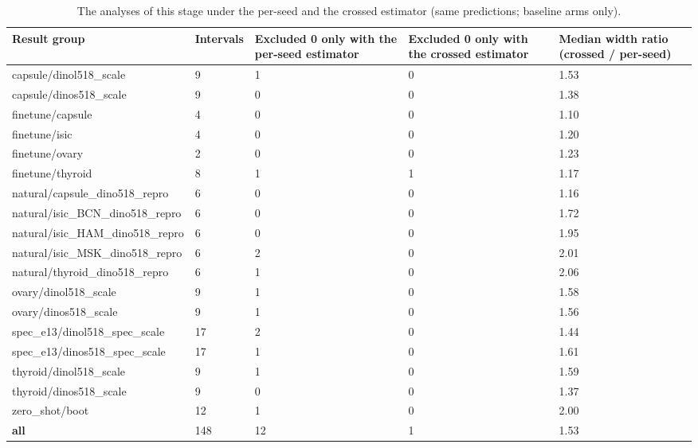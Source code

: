 \begin{table}[H]\centering\scriptsize
\caption{The analyses of this stage under the per-seed and the crossed estimator (same predictions; baseline arms only).}\label{tab:estcheck}
\begin{tabular}{p{5.0cm}p{1.4cm}p{2.6cm}p{2.6cm}p{2.4cm}}\toprule
Result group & Intervals & Excluded 0 only with the per-seed estimator & Excluded 0 only with the crossed estimator & Median width ratio (crossed / per-seed) \\\midrule
capsule/\allowbreak{}dinol518\_scale & 9 & 1 & 0 & 1.53 \\
capsule/\allowbreak{}dinos518\_scale & 9 & 0 & 0 & 1.38 \\
finetune/\allowbreak{}capsule & 4 & 0 & 0 & 1.10 \\
finetune/\allowbreak{}isic & 4 & 0 & 0 & 1.20 \\
finetune/\allowbreak{}ovary & 2 & 0 & 0 & 1.23 \\
finetune/\allowbreak{}thyroid & 8 & 1 & 1 & 1.17 \\
natural/\allowbreak{}capsule\_dino518\_repro & 6 & 0 & 0 & 1.16 \\
natural/\allowbreak{}isic\_BCN\_dino518\_repro & 6 & 0 & 0 & 1.72 \\
natural/\allowbreak{}isic\_HAM\_dino518\_repro & 6 & 0 & 0 & 1.95 \\
natural/\allowbreak{}isic\_MSK\_dino518\_repro & 6 & 2 & 0 & 2.01 \\
natural/\allowbreak{}thyroid\_dino518\_repro & 6 & 1 & 0 & 2.06 \\
ovary/\allowbreak{}dinol518\_scale & 9 & 1 & 0 & 1.58 \\
ovary/\allowbreak{}dinos518\_scale & 9 & 1 & 0 & 1.56 \\
spec\_e13/\allowbreak{}dinol518\_spec\_scale & 17 & 2 & 0 & 1.44 \\
spec\_e13/\allowbreak{}dinos518\_spec\_scale & 17 & 1 & 0 & 1.61 \\
thyroid/\allowbreak{}dinol518\_scale & 9 & 1 & 0 & 1.59 \\
thyroid/\allowbreak{}dinos518\_scale & 9 & 0 & 0 & 1.37 \\
zero\_shot/\allowbreak{}boot & 12 & 1 & 0 & 2.00 \\
\textbf{all} & 148 & 12 & 1 & 1.53 \\
\bottomrule\end{tabular}
\end{table}
